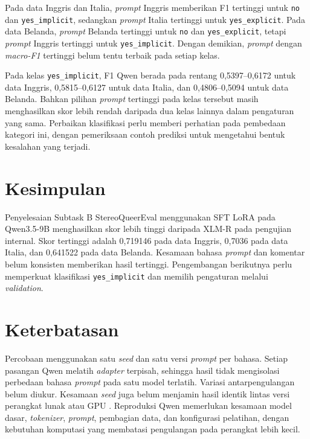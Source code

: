 \documentclass[11pt]{article}
\begin{document}
Pada data Inggris dan Italia, \textit{prompt} Inggris memberikan F1 tertinggi untuk \texttt{no} dan \nolinkurl{yes_implicit}, sedangkan \textit{prompt} Italia tertinggi untuk \nolinkurl{yes_explicit}. Pada data Belanda, \textit{prompt} Belanda tertinggi untuk \texttt{no} dan \nolinkurl{yes_explicit}, tetapi \textit{prompt} Inggris tertinggi untuk \nolinkurl{yes_implicit}. Dengan demikian, \textit{prompt} dengan \textit{macro-F1} tertinggi belum tentu terbaik pada setiap kelas.

Pada kelas \texttt{yes\_implicit}, F1 Qwen berada pada rentang 0,5397--0,6172 untuk data Inggris, 0,5815--0,6127 untuk data Italia, dan 0,4806--0,5094 untuk data Belanda. Bahkan pilihan \textit{prompt} tertinggi pada kelas tersebut masih menghasilkan skor lebih rendah daripada dua kelas lainnya dalam pengaturan yang sama. Perbaikan klasifikasi perlu memberi perhatian pada pembedaan kategori ini, dengan pemeriksaan contoh prediksi untuk mengetahui bentuk kesalahan yang terjadi.

\section{Kesimpulan}
Penyelesaian Subtask B StereoQueerEval menggunakan SFT LoRA pada Qwen3.5-9B menghasilkan skor lebih tinggi daripada XLM-R pada pengujian internal. Skor tertinggi adalah 0,719146 pada data Inggris, 0,7036 pada data Italia, dan 0,641522 pada data Belanda. Kesamaan bahasa \textit{prompt} dan komentar belum konsisten memberikan hasil tertinggi. Pengembangan berikutnya perlu memperkuat klasifikasi \texttt{yes\_implicit} dan memilih pengaturan melalui \textit{validation}.

\section*{Keterbatasan}
Percobaan menggunakan satu \textit{seed} dan satu versi \textit{prompt} per bahasa. Setiap pasangan Qwen melatih \textit{adapter} terpisah, sehingga hasil tidak mengisolasi perbedaan bahasa \textit{prompt} pada satu model terlatih. Variasi antarpengulangan belum diukur. Kesamaan \textit{seed} juga belum menjamin hasil identik lintas versi perangkat lunak atau GPU \citep{pytorch-reproducibility}. Reproduksi Qwen memerlukan kesamaan model dasar, \textit{tokenizer}, \textit{prompt}, pembagian data, dan konfigurasi pelatihan, dengan kebutuhan komputasi yang membatasi pengulangan pada perangkat lebih kecil.
\end{document}
